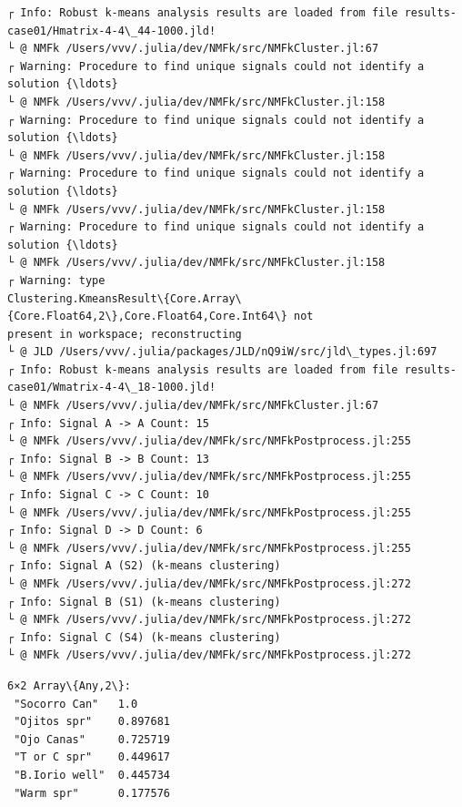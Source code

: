 \documentclass[11pt]{article}
\begin{document}
    
    \begin{Verbatim}[commandchars=\\\{\}]
┌ Info: Robust k-means analysis results are loaded from file results-
case01/Hmatrix-4-4\_44-1000.jld!
└ @ NMFk /Users/vvv/.julia/dev/NMFk/src/NMFkCluster.jl:67
┌ Warning: Procedure to find unique signals could not identify a solution {\ldots}
└ @ NMFk /Users/vvv/.julia/dev/NMFk/src/NMFkCluster.jl:158
┌ Warning: Procedure to find unique signals could not identify a solution {\ldots}
└ @ NMFk /Users/vvv/.julia/dev/NMFk/src/NMFkCluster.jl:158
┌ Warning: Procedure to find unique signals could not identify a solution {\ldots}
└ @ NMFk /Users/vvv/.julia/dev/NMFk/src/NMFkCluster.jl:158
┌ Warning: Procedure to find unique signals could not identify a solution {\ldots}
└ @ NMFk /Users/vvv/.julia/dev/NMFk/src/NMFkCluster.jl:158
┌ Warning: type
Clustering.KmeansResult\{Core.Array\{Core.Float64,2\},Core.Float64,Core.Int64\} not
present in workspace; reconstructing
└ @ JLD /Users/vvv/.julia/packages/JLD/nQ9iW/src/jld\_types.jl:697
┌ Info: Robust k-means analysis results are loaded from file results-
case01/Wmatrix-4-4\_18-1000.jld!
└ @ NMFk /Users/vvv/.julia/dev/NMFk/src/NMFkCluster.jl:67
┌ Info: Signal A -> A Count: 15
└ @ NMFk /Users/vvv/.julia/dev/NMFk/src/NMFkPostprocess.jl:255
┌ Info: Signal B -> B Count: 13
└ @ NMFk /Users/vvv/.julia/dev/NMFk/src/NMFkPostprocess.jl:255
┌ Info: Signal C -> C Count: 10
└ @ NMFk /Users/vvv/.julia/dev/NMFk/src/NMFkPostprocess.jl:255
┌ Info: Signal D -> D Count: 6
└ @ NMFk /Users/vvv/.julia/dev/NMFk/src/NMFkPostprocess.jl:255
┌ Info: Signal A (S2) (k-means clustering)
└ @ NMFk /Users/vvv/.julia/dev/NMFk/src/NMFkPostprocess.jl:272
┌ Info: Signal B (S1) (k-means clustering)
└ @ NMFk /Users/vvv/.julia/dev/NMFk/src/NMFkPostprocess.jl:272
┌ Info: Signal C (S4) (k-means clustering)
└ @ NMFk /Users/vvv/.julia/dev/NMFk/src/NMFkPostprocess.jl:272
    \end{Verbatim}

    
    \begin{Verbatim}[commandchars=\\\{\}]
6×2 Array\{Any,2\}:
 "Socorro Can"   1.0
 "Ojitos spr"    0.897681
 "Ojo Canas"     0.725719
 "T or C spr"    0.449617
 "B.Iorio well"  0.445734
 "Warm spr"      0.177576
    \end{Verbatim}

    
    \begin{center}
    \end{center}
    { \hspace*{\fill} \\}
    
\end{document}
